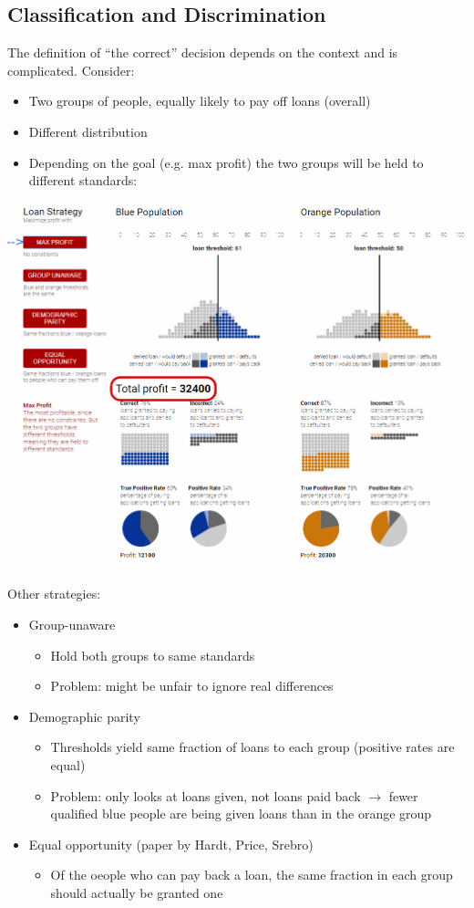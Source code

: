 \documentclass[12pt,a4paper]{article}
\begin{document}
\subsection{Classification and Discrimination}
The definition of ``the correct'' decision depends on the context and is complicated. Consider:
\begin{itemize}
\item Two groups of people, equally likely to pay off loans (overall)
\item Different distribution
\item Depending on the goal (e.g. max profit) the two groups will be held to different standards:
\end{itemize}
\includegraphics[scale=0.4]{resources/1/loanML2}
\begin{description}
\item Other strategies:
\end{description}
\begin{itemize}
\item Group-unaware
\begin{itemize}
\item Hold both groups to same standards 
\item Problem: might be unfair to ignore real differences
\end{itemize}
\item Demographic parity 
\begin{itemize}
\item Thresholds yield same fraction of loans to each group (positive rates are equal)
\item Problem: only looks at loans given, not loans paid back \(\rightarrow\) fewer qualified blue people are being given loans than in the orange group
\end{itemize}
\item Equal opportunity (paper by Hardt, Price, Srebro)
\begin{itemize}
\item Of the oeople who can pay back a loan, the same fraction in each group should actually be granted one
\end{itemize}
\end{itemize}
\end{document}
